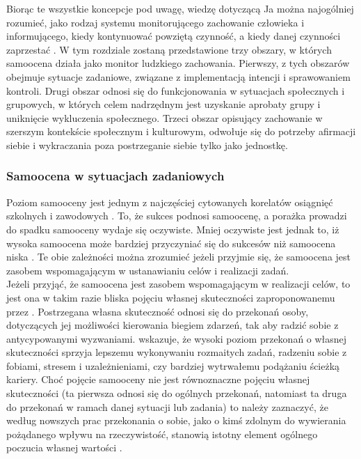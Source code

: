 \documentclass[man]{apa6}
\begin{document}
Biorąc te wszystkie koncepcje pod uwagę, wiedzę dotyczącą Ja można najogólniej rozumieć, jako rodzaj systemu monitorującego zachowanie człowieka  i informującego, kiedy kontynuować powziętą czynność, a kiedy danej czynności zaprzestać \parencite{higgins1996self}. W tym rozdziale zostaną przedstawione trzy obszary, w których samoocena działa jako monitor ludzkiego zachowania. Pierwszy, z tych obszarów obejmuje sytuacje zadaniowe, związane z implementacją intencji i sprawowaniem kontroli. Drugi obszar odnosi się do funkcjonowania w sytuacjach społecznych i grupowych, w których celem nadrzędnym jest uzyskanie aprobaty grupy i uniknięcie wykluczenia społecznego. Trzeci obszar opisujący zachowanie w szerszym kontekście społecznym i kulturowym, odwołuje się do potrzeby afirmacji siebie i wykraczania poza postrzeganie siebie tylko jako jednostkę.\\

\subsubsection{Samoocena w sytuacjach zadaniowych}

Poziom samooceny jest jednym z najczęściej cytowanych korelatów osiągnięć szkolnych \parencite{hansford1982relationship, davies1999reading} i zawodowych \parencite{judge2001relationship}. To, że sukces podnosi samoocenę, a porażka prowadzi do spadku samooceny wydaje się oczywiste. Mniej oczywiste jest jednak to, iż wysoka samoocena może bardziej przyczyniać się do sukcesów niż samoocena niska \parencite{bandura1982self}. Te obie zależności można zrozumieć jeżeli przyjmie się, że samoocena jest zasobem wspomagającym w ustanawianiu celów i realizacji zadań.\\

Jeżeli przyjąć, że samoocena jest zasobem wspomagającym w realizacji celów, to jest ona w takim razie bliska pojęciu własnej skuteczności zaproponowanemu przez \textcite{bandura1977self, bandura1994self}. Postrzegana własna skuteczność odnosi się do przekonań osoby, dotyczących jej możliwości kierowania biegiem zdarzeń, tak aby radzić sobie z antycypowanymi wyzwaniami. \textcite{bandura1982self} wskazuje, że wysoki poziom przekonań o własnej skuteczności sprzyja lepszemu wykonywaniu rozmaitych zadań, radzeniu sobie z fobiami, stresem i uzależnieniami, czy bardziej wytrwałemu podążaniu ścieżką kariery. Choć pojęcie samooceny nie jest równoznaczne pojęciu własnej skuteczności (ta pierwsza odnosi się do ogólnych przekonań, natomiast ta druga do przekonań w ramach danej sytuacji lub zadania) to należy zaznaczyć, że według nowszych prac przekonania o sobie, jako o kimś zdolnym do wywierania pożądanego wpływu na rzeczywistość, stanowią istotny element ogólnego poczucia własnej wartości \parencite{tafarodi2001two}.\\
\end{document}
